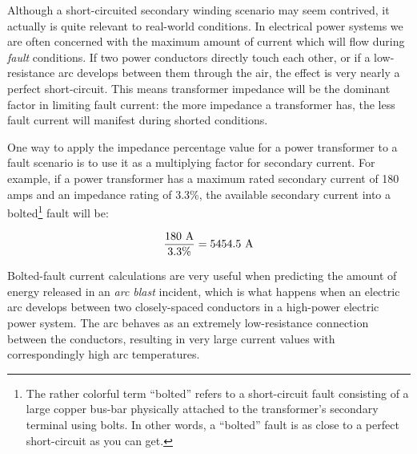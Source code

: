 \vskip 10pt

Although a short-circuited secondary winding scenario may seem contrived, it actually is quite relevant to real-world conditions.  In electrical power systems we are often concerned with the maximum amount of current which will flow during \textit{fault} conditions.  If two power conductors directly touch each other, or if a low-resistance arc develops between them through the air, the effect is very nearly a perfect short-circuit.  This means transformer impedance will be the dominant factor in limiting fault current: the more impedance a transformer has, the less fault current will manifest during shorted conditions.

One way to apply the impedance percentage value for a power transformer to a fault scenario is to use it as a multiplying factor for secondary current.  For example, if a power transformer has a maximum rated secondary current of 180 amps and an impedance rating of 3.3\%, the available secondary current into a bolted\footnote{The rather colorful term ``bolted'' refers to a short-circuit fault consisting of a large copper bus-bar physically attached to the transformer's secondary terminal using bolts.  In other words, a ``bolted'' fault is as close to a perfect short-circuit as you can get.} fault will be:  

$${180 \hbox{ A} \over 3.3\%} = 5454.5 \hbox{ A}$$

Bolted-fault current calculations are very useful when predicting the amount of energy released in an \textit{arc blast} incident, which is what happens when an electric arc develops between two closely-spaced conductors in a high-power electric power system.  The arc behaves as an extremely low-resistance connection between the conductors, resulting in very large current values with correspondingly high arc temperatures.  

\vskip 10pt

